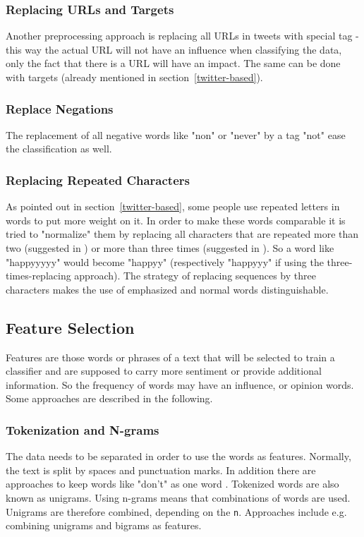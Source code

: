 \documentclass{acm_proc_article-sp}
\begin{document}
\subsubsection{Replacing URLs and Targets} Another preprocessing approach is
replacing all URLs in tweets with special tag - this way the actual URL will
not have an influence when classifying the data, only the fact that there is a
URL will have an impact.  The same can be done with targets (already mentioned
in section~\ref{twitter-based}).

\subsubsection{Replace Negations} The replacement of all negative words like
"non" or "never" by a tag "not" ease the classification as well.

\subsubsection{Replacing Repeated Characters} As pointed out in
section~\ref{twitter-based}, some people use repeated letters in words to put
more weight on it. In order to make these words comparable it is tried to
"normalize" them by replacing all characters that are repeated more than two
(suggested in \cite{go2009twitter}) or more than three times (suggested in
\cite{agarwal2011sentiment}). So a word like "happyyyyy" would become "happyy"
(respectively "happyyy" if using the three-times-replacing approach). The
strategy of replacing sequences by three characters makes the use of emphasized
and normal words distinguishable.

\subsection{Feature Selection} Features are those words or phrases of a text
that will be selected to train a classifier and are  supposed to carry more
sentiment or provide additional information. So the frequency of words may have
an influence, or opinion words. Some approaches are described in the following.

\subsubsection{Tokenization and N-grams} The data needs to be separated in
order to use the words as features. Normally, the text is split by spaces and
punctuation marks. In addition there are approaches to keep words like "don't"
as one word \cite{pak2010twitter}. Tokenized words are also known as unigrams.
Using n-grams means that combinations of words are used. Unigrams are therefore
combined, depending on the \texttt{n}. Approaches include e.g. combining
unigrams and bigrams as features.  \cite{liu2010sentimentanalysis,
go2009twitter}
\end{document}
